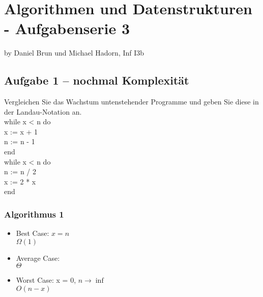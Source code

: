 
\chapter*{Algorithmen und Datenstrukturen - Aufgabenserie 3}
\begin{flushright}
by Daniel Brun und Michael Hadorn, Inf I3b
\end{flushright}
\section*{Aufgabe 1 – nochmal Komplexität}

Vergleichen Sie das Wachstum untenstehender Programme und geben Sie diese in der Landau-Notation an.\\

\noindent
while x < n do\\
	x := x + 1\\
	n := n - 1\\	
end\\

\noindent
while x < n do\\
	n := n / 2\\
	x := 2 * x\\
end\\

\subsection*{Algorithmus 1}

\begin{itemize}
	\item Best Case:  $x = n$ \\
		  $\Omega(1)$
	\item Average Case: \\
		  $\Theta$
	\item Worst Case: x = 0, $n \rightarrow \inf$ \\
		  $O(n-x)$
\end{itemize}

